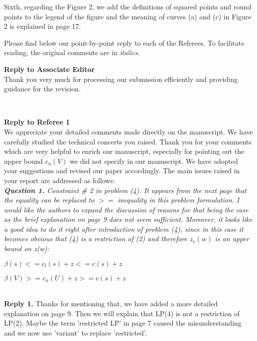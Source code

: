 \documentclass[11pt]{article}
\begin{document}
Sixth, regarding the Figure 2, we add the definitions of squared points and round points to the legend of the figure and the meaning of curves (a) and (c) in Figure 2 is explained in page 17.


Please find below our point-by-point reply to each of the Referees. To facilitate reading, the original comments are in {\it italics}.



\newpage

\noindent \textbf{\large Reply to Associate Editor}
\\[3mm]
Thank you very much for processing our submission efficiently and providing guidance for the revision.

\\[4mm]


\newpage

\noindent \textbf{\large Reply to Referee 1}
\\[3mm]
We appreciate your detailed comments made directly on the manuscript.
We have carefully studied the technical concerts you raised.
Thank you for your comments which are very helpful to enrich our manuscript, especially for pointing out the upper bound $c_u(V)$ we did not specify in our manuscript. We have adopted your suggestions and revised our paper accordingly. The main issues raised in your report are addressed as follows:
\\[4mm]
%
%
\noindent \textit{\textbf{Question 1.}
Constraint \# 2 in problem (4). It appears from the next page that the equality can be replaced to $>=$ inequality in this problem formulation. I would like the authors to expand the discussion of reasons for that being the case as the brief explanation on page 9 does not seem sufficient. Moreover, it looks like a good idea to do it right after introduction of problem (4), since in this case it becomes obvious that (4) is a restriction of (2) and therefore $z_r(w)$ is an upper bound on z(w):}

$\beta(s) <= c_l(s) + z <= c(s) + z$

$\beta(V) >= c_u(U) + z >= c(s) + z$

\\[2mm]
\noindent \textbf{Reply 1.}
Thanks for mentioning that, we have added a more detailed explanation on page 9.
Then we will explain that LP(4) is not a restriction of LP(2). Maybe the term 'restricted LP' in page 7 caused the misunderstanding and we now use 'variant' to replace 'restricted'.
\end{document}
